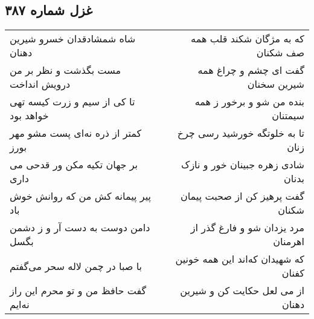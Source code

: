 \begin{center}
\section*{غزل شماره ۳۸۷}
\label{sec:sh387}
\begin{longtable}{l p{0.5cm} r}
شاه شمشادقدان خسرو شیرین دهنان
&&
که به مژگان شکند قلب همه صف شکنان
\\
مست بگذشت و نظر بر من درویش انداخت
&&
گفت ای چشم و چراغ همه شیرین سخنان
\\
تا کی از سیم و زرت کیسه تهی خواهد بود
&&
بنده من شو و برخور ز همه سیمتنان
\\
کمتر از ذره نه‌ای پست مشو مهر بورز
&&
تا به خلوتگه خورشید رسی چرخ زنان
\\
بر جهان تکیه مکن ور قدحی می داری
&&
شادی زهره جبینان خور و نازک بدنان
\\
پیر پیمانه کش من که روانش خوش باد
&&
گفت پرهیز کن از صحبت پیمان شکنان
\\
دامن دوست به دست آر و ز دشمن بگسل
&&
مرد یزدان شو و فارغ گذر از اهرمنان
\\
با صبا در چمن لاله سحر می‌گفتم
&&
که شهیدان که‌اند این همه خونین کفنان
\\
گفت حافظ من و تو محرم این راز نه‌ایم
&&
از می لعل حکایت کن و شیرین دهنان
\\
\end{longtable}
\end{center}
